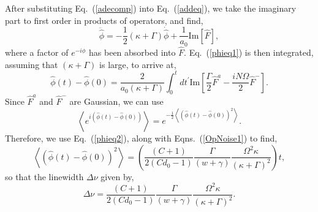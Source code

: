 \documentclass[aps,
twocolumn,
superscriptaddress,groupedaddress]{revtex4}
\begin{document}
After substituting Eq.~(\ref{adecomp}) into Eq.~(\ref{addeq}), we take
the imaginary part to first order in products of operators, and find,
\begin{equation}
\ddot{\hat{\phi}} =
-\frac{1}{2}(\kappa+\Gamma) \dot{\hat{\phi}} +
\frac{1}{a_0} \text{Im} [\hat{F}],
\label{phieq1}
\end{equation}
where a factor of $e^{-i\phi}$ has been absorbed into $\hat{F}$.
Eq.~(\ref{phieq1}) is then integrated, assuming that $(\kappa+\Gamma)$
is large, to arrive at,
\begin{equation}
\hat{\phi}(t) - \hat{\phi}(0) =
\frac{2}{a_0 (\kappa+\Gamma)}
\int_0^t dt^{\prime} \text{Im}
\left[ \frac{\Gamma}{2} \hat{F}^a-\frac{i N \Omega}{2} \hat{F}^-\right].
\label{phieq2}
\end{equation}
Since $ \hat{F}^a$ and $\hat{F}^-$ are Gaussian, we can use
\begin{equation}
\left< e^{i(\hat{\phi}(t) - \hat{\phi}(0))} \right> =
e^{-\frac{1}{2}\left< ( \hat{\phi}(t) - \hat{\phi}(0) )^2 \right>}.
\end{equation}
Therefore, we use Eq.~(\ref{phieq2}), along with Eqns.~(\ref{OpNoise1})
to find,
\begin{equation}
\left<(\hat{\phi}(t) - \hat{\phi}(0))^2 \right> =
\left(\frac{(C+1)}{2(Cd_0-1)} \frac{\Gamma}{(w+\gamma)}
\frac{\Omega^2 \kappa}{(\kappa+\Gamma)^2}\right) t,
\end{equation}
so that the linewidth $\Delta \nu$ given by,
\begin{equation}
\Delta \nu =
\frac{(C+1)}{2(Cd_0-1)} \frac{\Gamma}{(w+\gamma)}
\frac{\Omega^2 \kappa}{(\kappa+\Gamma)^2}.
\label{LWHaken}
\end{equation}



\end{document}
